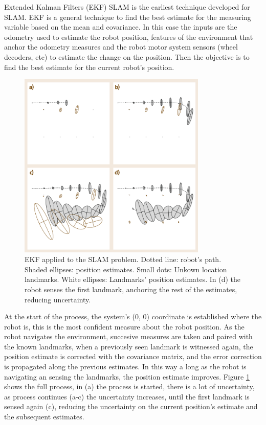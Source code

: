       Extended Kalman Filters (EKF) SLAM is the earliest technique developed for SLAM. EKF is a general technique to find the best estimate for the measuring variable based on the mean and covariance. In this case the inputs are the odometry used to estimate the robot position, features of the environment that anchor the odometry measures and the robot motor system sensors (wheel decoders, etc) to estimate the change on the position. Then the objective is to find the best estimate for the current robot's position.

      \begin{figure}[!t]
        \centering
        \includegraphics[width=0.8\textwidth]{./Figures/slam_ekf_model.png}
        \caption{EKF applied to the SLAM problem. Dotted line: robot's path. Shaded ellipses: position estimates. Small dots: Unkown location landmarks. White ellipses: Landmarks' position estimates. In (d) the robot senses the first landmark, anchoring the rest of the estimates, reducing uncertainty.}
        \label{ch_3:fig:ekf_slam}
      \end{figure}

      At the start of the process, the system's ($0$, $0$) coordinate is established where the robot is, this is the most confident measure about the robot position. As the robot navigates the environment, succesive measures are taken and paired with the known landmarks, when a previously seen landmark is witnessed again, the position estimate is corrected with the covariance matrix, and the error correction is propagated along the previous estimates. In this way a long as the robot is navigating an sensing the landmarks, the position estimate improves. Figure \ref{ch_3:fig:ekf_slam} shows the full process, in (a) the process is started, there is a lot of uncertainty, as process continues (a-c) the uncertainty increases, until the first landmark is sensed again (c), reducing the uncertainty on the current position's estimate and the subsequent estimates.

